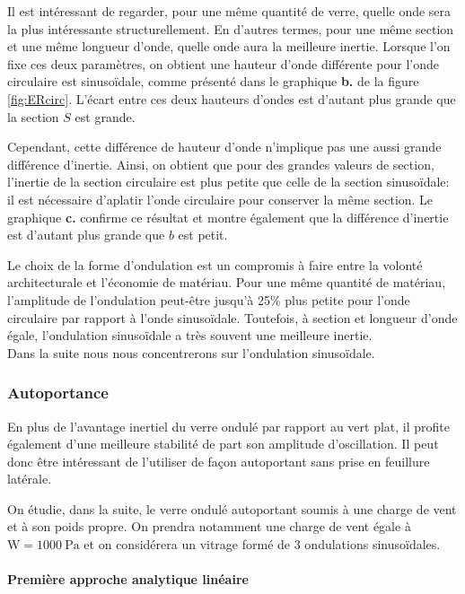 \documentclass[11pt,titlepage]{article}
\begin{document}
Il est intéressant de regarder, pour une même quantité de verre, quelle onde sera la plus intéressante structurellement. En d'autres termes, pour une même section et une même longueur d'onde, quelle onde aura la meilleure inertie. Lorsque l'on fixe ces deux paramètres, on obtient une hauteur d'onde différente pour l'onde circulaire est sinusoïdale, comme présenté dans le graphique \textbf{b.} de la figure \ref{fig:ERcirc}. L'écart entre ces deux hauteurs d'ondes est d'autant plus grande que la section $S$ est grande.

  Cependant, cette différence de hauteur d'onde n'implique pas une aussi grande différence d'inertie. Ainsi, on obtient que pour des grandes valeurs de section, l'inertie de la section circulaire est plus petite que celle de la section sinusoïdale: il est nécessaire d'aplatir l'onde circulaire pour conserver la même section. Le graphique \textbf{c.} confirme ce résultat et montre également que la différence d'inertie est d'autant plus grande que $b$ est petit.

  Le choix de la forme d'ondulation est un compromis à faire entre la volonté architecturale et l'économie de matériau. Pour une même quantité de matériau, l'amplitude de l'ondulation peut-être jusqu'à 25\% plus petite pour l'onde circulaire par rapport à l'onde sinusoïdale. Toutefois, à  section et longueur d'onde égale, l'ondulation sinusoïdale a très souvent une meilleure inertie.
  \\
  
Dans la suite nous nous concentrerons sur l'ondulation sinusoïdale.
\subsubsection{Autoportance}
En plus de l'avantage inertiel du verre ondulé par rapport au vert plat, il profite également d'une meilleure stabilité de part son amplitude d'oscillation. Il peut donc être intéressant de l'utiliser de façon autoportant sans prise en feuillure latérale. 

On étudie, dans la suite, le verre ondulé autoportant soumis à une charge de vent et à son poids propre. On prendra notamment une charge de vent égale à $\text{W} = \qty{1000}{\pascal}$ et on considérera un vitrage formé de 3 ondulations sinusoïdales.


\paragraph{Première approche analytique linéaire}\mbox{}
\end{document}
